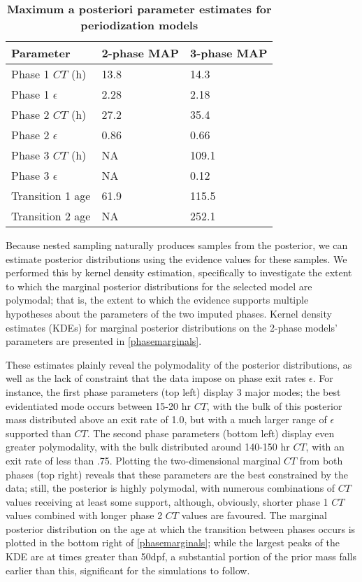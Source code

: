 \begin{table}[!ht]
    \centering
    \caption{{\bf Maximum a posteriori parameter estimates for periodization models}}
    \begin{tabular}{|l|l|l|}
        \hline
        {\bf Parameter} & {\bf 2-phase MAP} & {\bf 3-phase MAP}\\ \hline
        Phase 1 $CT$ (h) & 13.8 & 14.3\\ \hline
        Phase 1 $\epsilon$ & 2.28 & 2.18\\ \hline
        Phase 2 $CT$ (h) & 27.2 & 35.4\\ \hline
        Phase 2 $\epsilon$ & 0.86 & 0.66\\ \hline
        Phase 3 $CT$ (h) & NA & 109.1\\ \hline
        Phase 3 $\epsilon$ & NA & 0.12\\ \hline
        Transition 1 age & 61.9 & 115.5\\ \hline
        Transition 2 age & NA & 252.1\\ \hline
        \end{tabular}
    \begin{flushleft}
    \end{flushleft}
    \label{phaseMAPtable}
\end{table}

Because nested sampling naturally produces samples from the posterior, we can estimate posterior distributions using the evidence values for these samples. We performed this by kernel density estimation, specifically to investigate the extent to which the marginal posterior distributions for the selected model are polymodal; that is, the extent to which the evidence supports multiple hypotheses about the parameters of the two imputed phases. Kernel density estimates (KDEs) for marginal posterior distributions on the 2-phase models' parameters are presented in \autoref{phasemarginals}. 

These estimates plainly reveal the polymodality of the posterior distributions, as well as the lack of constraint that the data impose on phase exit rates $\epsilon$. For instance, the first phase parameters (top left) display 3 major modes; the best evidentiated mode occurs between 15-20 hr $CT$, with the bulk of this posterior mass distributed above an exit rate of 1.0, but with a much larger range of $\epsilon$ supported than $CT$. The second phase parameters (bottom left) display even greater polymodality, with the bulk distributed around 140-150 hr $CT$, with an exit rate of less than .75. Plotting the two-dimensional marginal $CT$ from both phases (top right) reveals that these parameters are the best constrained by the data; still, the posterior is highly polymodal, with numerous combinations of $CT$ values receiving at least some support, although, obviously, shorter phase 1 $CT$ values combined with longer phase 2 $CT$ values are favoured. The marginal posterior distribution on the age at which the transition between phases occurs is plotted in the bottom right of \autoref{phasemarginals}; while the largest peaks of the KDE are at times greater than 50dpf, a substantial portion of the prior mass falls earlier than this, significant for the simulations to follow.

